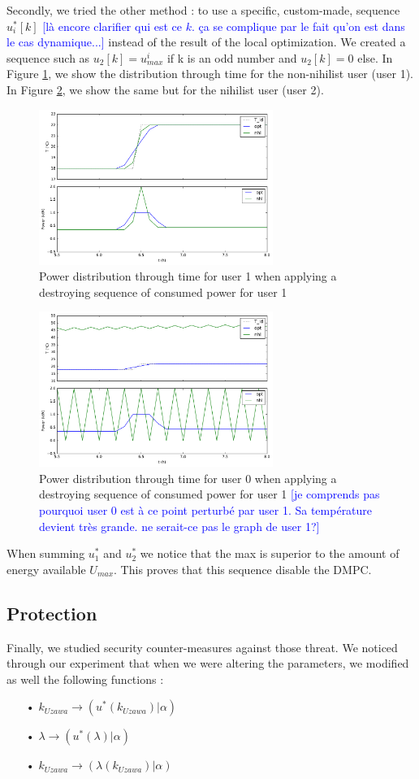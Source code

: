 \documentclass[conference]{IEEEtran}
\newcommand{\rem}[1]{\textcolor{blue}{[#1]}}
\begin{document}
Secondly, we tried the other method : to use a specific, custom-made, sequence $u^*_i[k]$ \rem{là encore clarifier qui est ce $k$. ça se complique par le fait qu'on est dans le cas dynamique...} instead of the result of the local optimization. We created a sequence such as $u_2[k] = u^i_{max}$ if k is an odd number and  $u_2[k]=0$ else.  In Figure \ref{Nihil_1}, we show the distribution through time for the non-nihilist user (user 1). In Figure \ref{Nihil_2}, we show the same but for the nihilist user (user 2).
\begin{figure}[H]
\centering
\includegraphics[width=3in]{NihilSeq_init.pdf}
\caption{Power distribution through time for user 1 when applying a destroying sequence of consumed power for user 1}
\label{Nihil_1}
\end{figure}

\begin{figure}[H]
\centering
\includegraphics[width=3in]{NihilSeq.pdf}
\caption{Power distribution through time for user 0 when applying a destroying sequence of consumed power for user 1
\rem{je comprends pas pourquoi user 0 est à ce point perturbé par user 1. Sa température devient très grande. ne serait-ce pas le graph de user 1?}
}
\label{Nihil_2}
\end{figure}

When summing $u^*_1$ and $u^*_2$ we notice that the max is superior to the amount of energy available $U_{max}$. This proves that this sequence disable the DMPC. 

\subsection{Protection}
Finally, we studied security counter-measures against those threat. We noticed through our experiment that when we were altering the parameters, we modified as well the following functions :
\begin{itemize}
\item[•] $k_{Uzawa} \rightarrow (u^*(k_{Uzawa}) | \alpha)$
\item[•] $\lambda \rightarrow (u^*(\lambda) | \alpha)$
\item[•] $k_{Uzawa} \rightarrow (\lambda (k_{Uzawa}) | \alpha)$
\end{itemize} 
\end{document}
